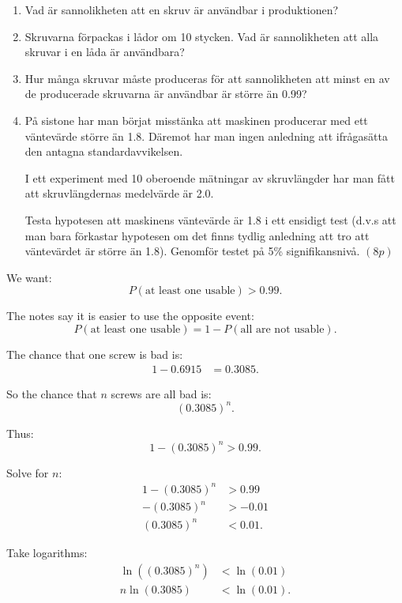 \documentclass[10pt]{article}
\begin{document}
\begin{enumerate}[label=\alph*)]
\item Vad är sannolikheten att en skruv är användbar
i produktionen?

\item Skruvarna förpackas i lådor om 10 stycken.
Vad är sannolikheten att alla skruvar i en låda är
användbara?

\item Hur många skruvar måste produceras för att
sannolikheten att minst en av de producerade
skruvarna är användbar är större än 0.99?

\item På sistone har man börjat misstänka att
maskinen producerar med ett väntevärde större än
1.8. Däremot har man ingen anledning att ifrågasätta
den antagna standardavvikelsen.

I ett experiment med 10 oberoende mätningar av
skruvlängder har man fått att skruvlängdernas
medelvärde är 2.0.

Testa hypotesen att maskinens väntevärde är 1.8 i
ett ensidigt test (d.v.s att man bara förkastar
hypotesen om det finns tydlig anledning att tro att
väntevärdet är större än 1.8). Genomför testet på
5\% signifikansnivå. \((8p)\)
\end{enumerate}

We want:
\[
P(\text{at least one usable})>0.99.
\]

The notes say it is easier to use the opposite event:
\[
P(\text{at least one usable})
=
1-P(\text{all are not usable}).
\]

The chance that one screw is bad is:
\begin{align*}
1-0.6915
&=
0.3085.
\end{align*}

So the chance that \(n\) screws are all bad is:
\[
(0.3085)^n.
\]

Thus:
\[
1-(0.3085)^n>0.99.
\]

Solve for \(n\):
\begin{align*}
1-(0.3085)^n
&>0.99
\\[2mm]
-(0.3085)^n
&>-0.01
\\[2mm]
(0.3085)^n
&<0.01.
\end{align*}

Take logarithms:
\begin{align*}
\ln\left((0.3085)^n\right)
&<
\ln(0.01)
\\[2mm]
n\ln(0.3085)
&<
\ln(0.01).
\end{align*}
\end{document}
